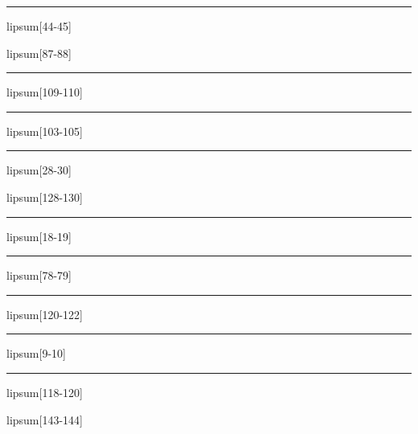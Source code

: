 \documentclass[11pt,a4paper]{article}
\begin{document}
\begin{simplewrap}
  \textcolor{green!17}{\rule{3.4cm}{5.2cm}}
\end{simplewrap}
lipsum[44-45]

lipsum[87-88]

\begin{simplewrap}
  \textcolor{yellow!48}{\rule{5.5cm}{5.2cm}}
\end{simplewrap}
lipsum[109-110]

\begin{simplewrap}
  \textcolor{teal!58}{\rule{5.1cm}{6.7cm}}
\end{simplewrap}
lipsum[103-105]

\begin{simplewrap}
  \textcolor{pink!41}{\rule{4.5cm}{3.2cm}}
\end{simplewrap}
lipsum[28-30]

lipsum[128-130]

\begin{simplewrap}
  \textcolor{magenta!50}{\rule{5.8cm}{2.2cm}}
\end{simplewrap}
lipsum[18-19]

\begin{simplewrap}
  \textcolor{red!21}{\rule{4.1cm}{7.4cm}}
\end{simplewrap}
lipsum[78-79]

\begin{simplewrap}
  \textcolor{orange!58}{\rule{3.2cm}{8.0cm}}
\end{simplewrap}
lipsum[120-122]

\begin{simplewrap}
  \textcolor{red!41}{\rule{4.5cm}{6.3cm}}
\end{simplewrap}
lipsum[9-10]

\begin{simplewrap}
  \textcolor{orange!34}{\rule{4.4cm}{8.8cm}}
\end{simplewrap}
lipsum[118-120]

lipsum[143-144]
\end{document}
